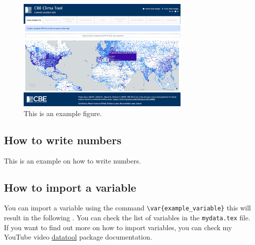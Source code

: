 \begin{figure}[htb!]
    \centering
    \includegraphics[width=0.75\textwidth]{figures/example_clima}
    \caption{This is an example figure.}
    \label{fig:example}
\end{figure}

\subsection{How to write numbers}\label{subsec:how-to-write-numbers}
This is an example on how to write numbers.

\subsection{How to import a variable}\label{subsec:how-to-import-a-variable}
You can import a variable using the command \verb!\var{example_variable}! this will result in the following .
You can check the list of variables in the \texttt{mydata.tex} file.
If you want to find out more on how to import variables, you can check my YouTube video \href{https://ctan.org/pkg/datatool}{datatool} package documentation.
